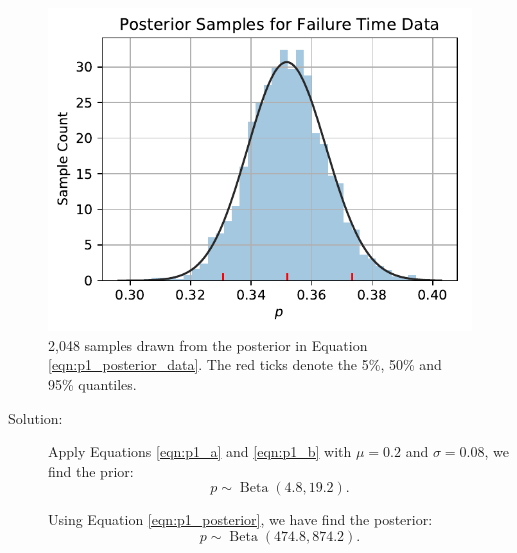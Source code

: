 \documentclass[letterpaper,11pt]{article}
\begin{document}
\begin{enumerate}
\begin{enumerate}
    \begin{figure}
      \centering
      \includegraphics{p1_posterior_samples.pdf}
      \caption{2,048 samples drawn from the posterior in Equation
        \ref{eqn:p1_posterior_data}. The red ticks denote the 5\%, 50\% and
        95\% quantiles.}
      \label{fig:p1_posterior_samples}
    \end{figure}
    
    \begin{description}
    \item[Solution:] Apply Equations \ref{eqn:p1_a} and \ref{eqn:p1_b} with
      $\mu = 0.2$ and $\sigma = 0.08$, we find the prior:
      \begin{equation}
        p \sim \operatorname{Beta}\left(4.8, 19.2\right).
        \label{eqn:p1_prior}
      \end{equation}

      Using Equation \ref{eqn:p1_posterior}, we have find the posterior:
      \begin{equation}
        p \sim \operatorname{Beta}\left(474.8, 874.2\right).
        \label{eqn:p1_posterior_data}
      \end{equation}
      

\end{description}
\end{enumerate}
\end{enumerate}
\end{document}
